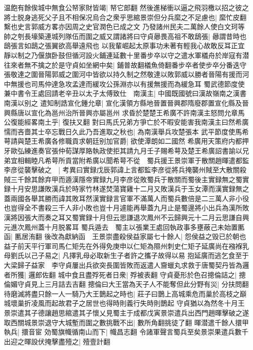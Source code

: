 温飽有餘俟城中無食公帑家財皆竭|{
	帑它郎翻}
然後進梯衝以逼之飛羽檄以招之彼之將士脱身逃死父子且不相保况烏合之衆乎思綰景崇但分兵縻之不足慮也|{
	縻忙皮翻繫也史言郭威方畧亦因周之史官潤色已成之文}
乃發諸州民夫二萬餘人使白文珂等帥之刳長壕築連城列隊伍而圍之威又謂諸將曰守貞曏畏高祖不敢鴟張|{
	曏謂昔時也鴟張言如鴟之張翼欲高舉遠飛也}
以我輩崛起太原事功未著有輕我心故敢反耳正宜靜以制之乃偃旗卧鼓但循河設火鋪連延數十里番步卒以守之遣水軍檥舟於岸寇有潜往來者無不擒之於是守貞如坐網中矣|{
	鋪普故翻檥魚倚翻番步卒者使步卒分番迭守張敬達之圍晉陽郭威之圍河中皆欲以持久制之然敬達以敗郭威以勝者晉陽有援而河中無援也司馬仲達急攻孟達而緩攻公孫淵亦以有援無援而為緩急耳}
蜀武德節度使兼中書令王處回請老辛丑以太子太傅致仕　南漢主|{
	中國既國號曰漢故嶺南之漢書南漢以别之}
遣知制誥宣化鍾允章|{
	宣化漢領方縣地晉置晉興郡隋廢郡置宣化縣及晉興縣唐以宣化為邕州治所晉興亦屬邕州}
求昏於楚楚王希廣不許南漢主怒問允章馬公復能經畧南土乎|{
	復扶又翻}
對曰馬氏兄弟方爭亡於不暇安能害我南漢主曰然希廣懦而吝嗇其士卒忘戰日久此乃吾進取之秋也|{
	為南漢舉兵攻楚張本}
武平節度使馬希萼請與楚王希廣各修職貢求朝廷别加官爵|{
	欲使潭朗如二國然}
希廣用天策府内都押牙歐弘練進奏官張仲荀謀厚賂執政使拒其請九月壬子賜希萼及楚王希廣詔書諭以兄弟宜相輯睦凡希萼所貢當附希廣以聞希萼不從　蜀兵援王景崇軍于散關趙暉遣都監李彦從襲擊破之　|{
	考異曰實録戊辰郭諱上言都監李彦從將兵掩襲州賊至大散關殺賊三千餘其餘弃甲而遁漢隱帝實録九月李彦從敗蜀兵于散關而蜀後主實録無之蜀實録十月安思謙敗漢兵於時家竹林遂焚蕩寶雞十二月又敗漢兵于玉女潭而漢實録無之蓋兩國各舉其勝而諱其敗耳然漢實録言官軍不滿萬人而蜀兵數倍是二三萬人非小役也豈得全不書殺三千人非小敗也豈十月遽能再舉蓋九月止是蜀邊將小出兵為漢所敗漢將因張大而奏之耳又蜀實録十月但云思謙退次鳳州不云歸興元十二月云思謙自興元進次鳳州蓋十月脱畧耳}
蜀兵遁去　蜀主以張業王處回執政事多壅蔽己未始置匭函|{
	匭居洧翻}
後改為獻納函　王景崇盡殺侯益家屬七十餘人|{
	怨侯益之毁已於朝也}
益子前天平行軍司馬仁矩先在外得免庚申以仁矩為隰州刺史仁矩子延廣尚在襁褓乳母劉氏以己子易之|{
	凡擇乳母必取新生子者許之攜子故得以易}
抱延廣而逃乞食至于大梁歸子益家　李守貞屢出兵欲突長圍皆敗而返遣人齎蠟丸求救于唐蜀契丹皆為邏者所獲|{
	邏郎佐翻}
城中食且盡殍死者日衆|{
	殍被表翻}
守貞憂形於色召摠倫詰之|{
	摠倫媚守貞見上三月詰去吉翻}
摠倫曰大王當為天子人不能奪但此分野有災|{
	分扶問翻}
待磨滅將盡只餘一人一騎乃大王鵲起之時也|{
	莊子曰鵲上高城乘危而巢於高枝之巔城壞巢折凌風而起故君子之居世也得時則義行失時則鵲起}
守貞猶以為然冬十月王景崇遣其子德讓趙思綰遣其子懷乂見蜀主于成都戊寅景崇遣兵出西門趙暉擊破之遂取西關城景崇退守大城塹而圍之數挑戰不出|{
	數所角翻挑徒了翻}
暉潜遣千餘人擐甲執兵|{
	擐音宦}
効蜀旗幟循南山而下|{
	幟昌志翻}
令諸軍聲言蜀兵至矣景崇果遣兵數千出迎之暉設伏掩擊盡殪之|{
	殪壹計翻}
